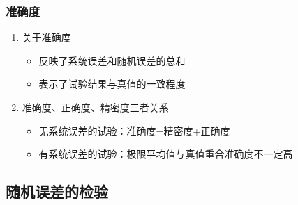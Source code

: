 \documentclass[UTF8]{ctexart}
\begin{document}
\subsubsection{准确度}
\begin{enumerate}[•]
  \item 关于准确度
    \begin{itemize}
    \item 反映了系统误差和随机误差的总和
    \item 表示了试验结果与真值的一致程度
    \end{itemize} 
  \item 准确度、正确度、精密度三者关系
    \begin{itemize}
    \item 无系统误差的试验：准确度=精密度+正确度
    \item 有系统误差的试验：极限平均值与真值重合准确度不一定高
   \end{itemize} 
\end{enumerate}

\subsection{随机误差的检验}
\end{document}
